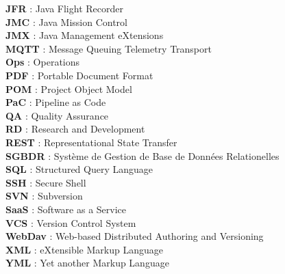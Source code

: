\textbf{JFR} : Java Flight Recorder\\

\textbf{JMC} : Java Mission Control\\

\textbf{JMX} : Java Management eXtensions\\

\textbf{MQTT} : Message Queuing Telemetry Transport\\

\textbf{Ops} : Operations\\

\textbf{PDF} : Portable Document Format\\

\textbf{POM} : Project Object Model\\

\textbf{PaC} : Pipeline as Code\\

\textbf{QA} : Quality Assurance\\

\textbf{RD} : Research and Development\\

\textbf{REST} : Representational State Transfer\\

\textbf{SGBDR} : Système de Gestion de Base de Données Relationelles\\

\textbf{SQL} : Structured Query Language\\

\textbf{SSH} : Secure Shell\\

\textbf{SVN} : Subversion\\

\textbf{SaaS} : Software as a Service\\

\textbf{VCS} : Version Control System\\

\textbf{WebDav} : Web-based Distributed Authoring and Versioning\\

\textbf{XML} : eXtensible Markup Language\\

\textbf{YML} : Yet another Markup Language\\